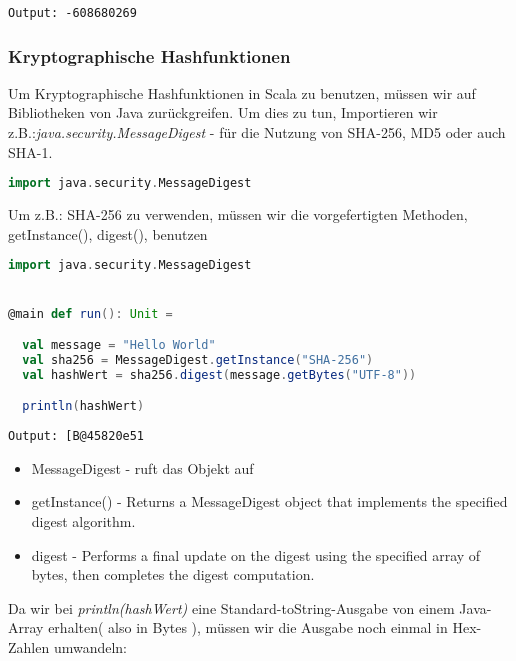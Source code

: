 

\begin{verbatim}
Output: -608680269
\end{verbatim}

\subsubsection*{Kryptographische Hashfunktionen}

Um Kryptographische Hashfunktionen in Scala zu benutzen, müssen wir auf Bibliotheken von Java zurückgreifen. Um dies zu tun, Importieren wir z.B.:\textit{java.security.MessageDigest} - für die Nutzung von SHA-256, MD5 oder auch SHA-1.\cite{sha-256}

\begin{lstlisting}[language=Scala]
import java.security.MessageDigest
\end{lstlisting}

Um z.B.: SHA-256 zu verwenden, müssen wir die vorgefertigten Methoden, getInstance(), digest(), benutzen

\begin{lstlisting}[language=Scala]
import java.security.MessageDigest


@main def run(): Unit =

  val message = "Hello World"
  val sha256 = MessageDigest.getInstance("SHA-256")
  val hashWert = sha256.digest(message.getBytes("UTF-8"))

  println(hashWert)
\end{lstlisting}

\begin{verbatim}
Output: [B@45820e51
\end{verbatim}

\begin{itemize}
\item MessageDigest - ruft das Objekt auf
\item getInstance() - Returns a MessageDigest object that implements the specified digest algorithm.
\item digest - Performs a final update on the digest using the specified array of bytes, then completes the digest computation.
\end{itemize}

Da wir bei \textit{println(hashWert)} eine Standard-toString-Ausgabe von einem Java-Array erhalten( also in Bytes ), müssen wir die Ausgabe noch einmal in Hex-Zahlen umwandeln:

